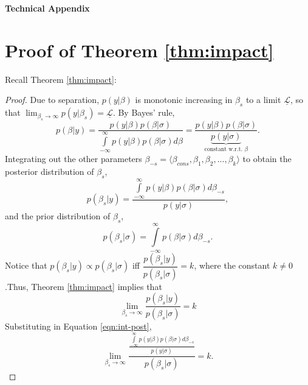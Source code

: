 \documentclass[12pt]{article}
\begin{document}
\clearpage
\doublespace
\begin{appendix}
\begin{center}
\LARGE{\textbf{Technical Appendix}}\vspace{4mm}
\end{center}

\section*{Proof of Theorem \ref{thm:impact}}

Recall Theorem \ref{thm:impact}:

\impact*

\begin{proof}
Due to separation, $p(y|\beta)$ is monotonic increasing in $\beta_s$ to a limit $\underline{\mathscr{L}}$, so that $\displaystyle \lim_{\beta_s \to \infty} p(y | \beta_s) = \underline{\mathscr{L}}$. By Bayes' rule, 
\begin{equation*}
p(\beta | y) = \dfrac{p(y | \beta)p(\beta | \sigma)}{\int\limits_{-\infty}^{\infty}p(y | \beta)p(\beta | \sigma)d\beta} = \dfrac{p(y | \beta)p(\beta | \sigma)}{\underbrace{p(y | \sigma)}_{\text{constant w.r.t. }\beta}}. 
\end{equation*}
Integrating out the other parameters $\beta_{-s} = \langle \beta_{cons}, \beta_1, \beta_2, ..., \beta_k \rangle$ to obtain the posterior distribution of $\beta_s$, 
\begin{equation}\label{eqn:int-post}
p(\beta_s | y) = \dfrac{\int\limits_{-\infty}^{\infty}p(y | \beta)p(\beta | \sigma)d\beta_{-s}}{p(y | \sigma)}, 
\end{equation}
and the prior distribution of $\beta_s$, 
\begin{equation*}
p(\beta_s | \sigma) = \int\limits_{-\infty}^{\infty}p(\beta | \sigma)d\beta_{-s}.
\end{equation*}
Notice that $p(\beta_s | y) \propto p(\beta_s | \sigma)$ iff $\dfrac{p(\beta_s | y)}{p(\beta_s | \sigma)} = k$, where the constant $k \neq 0$.Thus, Theorem \ref{thm:impact} implies that
\begin{equation*}
\lim _{\beta_s \to \infty} \dfrac{p(\beta_s | y)}{p(\beta_s | \sigma)} = k
\end{equation*}
Substituting in Equation \ref{eqn:int-post},
\begin{equation*}
\lim _{\beta_s \to \infty} \dfrac{\frac{\int\limits_{-\infty}^{\infty}p(y | \beta)p(\beta | \sigma)d\beta_{-s}}{p(y | \sigma)}}{p(\beta_s | \sigma)} = k.
\end{equation*}

\end{proof}
\end{appendix}
\end{document}
